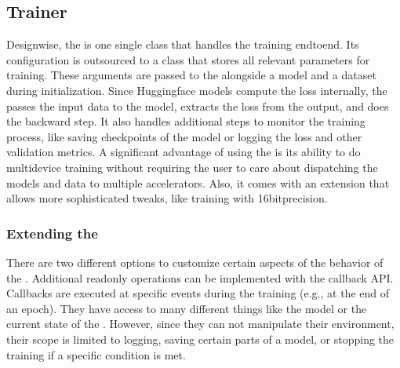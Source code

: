 \documentclass[letterpaper,10pt,english]{jupyterBook}
\begin{document}
\subsection{Trainer}
\label{\detokenize{HuggingFaceTrainer:trainer}}
\sphinxAtStartPar
Design\sphinxhyphen{}wise, the  is one single class that handles the training end\sphinxhyphen{}to\sphinxhyphen{}end.
Its configuration is outsourced to a  class that stores all relevant parameters for training.
These arguments are passed to the   alongside a model and a dataset during initialization.
Since Huggingface models compute the loss internally, the  passes the input data to the model, extracts the loss from the output, and does the backward step.
It also handles additional steps to monitor the training process, like saving checkpoints of the model or logging the loss and other validation metrics.
A significant advantage of using the  is its ability to do multi\sphinxhyphen{}device training without requiring the user to care about dispatching the models and data to multiple accelerators.
Also, it comes with an extension that allows more sophisticated tweaks, like training with 16bit\sphinxhyphen{}precision.


\subsubsection{Extending the }
\label{\detokenize{HuggingFaceTrainer:extending-the-trainer}}
\sphinxAtStartPar
There are two different options to customize certain aspects of the behavior of the .
Additional read\sphinxhyphen{}only operations can be implemented with the callback API.
Callbacks are executed at specific events during the training (e.g., at the end of an epoch).
They have access to many different things like the model or the current state of the .
However, since they can not manipulate their environment, their scope is limited to logging, saving certain parts of a model, or stopping the training if a specific condition is met.
\end{document}
